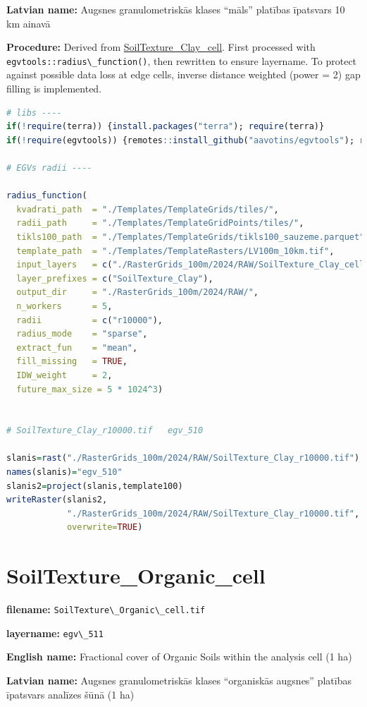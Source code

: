 \documentclass[
]{book}
\newcommand{\passthrough}[1]{#1}
\begin{document}
\textbf{Latvian name:} Augsnes granulometriskās klases ``māls'' platības īpatsvars 10 km ainavā

\textbf{Procedure:} Derived from \hyperref[ch06.506]{SoilTexture\_Clay\_cell}. First processed
with \passthrough{\lstinline!egvtools::radius\_function()!}, then rewritten to ensure layername. To protect against
possible data loss at edge cells, inverse distance weighted (power = 2) gap filling
is implemented.

\begin{lstlisting}[language=R]
# libs ----
if(!require(terra)) {install.packages("terra"); require(terra)}
if(!require(egvtools)) {remotes::install_github("aavotins/egvtools"); require(egvtools)}

# EGVs radii ----

radius_function(
  kvadrati_path  = "./Templates/TemplateGrids/tiles/",
  radii_path     = "./Templates/TemplateGridPoints/tiles/",
  tikls100_path  = "./Templates/TemplateGrids/tikls100_sauzeme.parquet",
  template_path  = "./Templates/TemplateRasters/LV100m_10km.tif",
  input_layers   = c("./RasterGrids_100m/2024/RAW/SoilTexture_Clay_cell.tif"),
  layer_prefixes = c("SoilTexture_Clay"),
  output_dir     = "./RasterGrids_100m/2024/RAW/",
  n_workers      = 5,
  radii          = c("r10000"),
  radius_mode    = "sparse",
  extract_fun    = "mean",
  fill_missing   = TRUE,
  IDW_weight     = 2,
  future_max_size = 5 * 1024^3)


# SoilTexture_Clay_r10000.tif   egv_510

slanis=rast("./RasterGrids_100m/2024/RAW/SoilTexture_Clay_r10000.tif")
names(slanis)="egv_510"
slanis2=project(slanis,template100)
writeRaster(slanis2,
            "./RasterGrids_100m/2024/RAW/SoilTexture_Clay_r10000.tif",
            overwrite=TRUE)
\end{lstlisting}

\section{SoilTexture\_Organic\_cell}\label{ch06.511}

\textbf{filename:} \passthrough{\lstinline!SoilTexture\_Organic\_cell.tif!}

\textbf{layername:} \passthrough{\lstinline!egv\_511!}

\textbf{English name:} Fractional cover of Organic Soils within the analysis cell (1 ha)

\textbf{Latvian name:} Augsnes granulometriskās klases ``organiskās augsnes'' platības īpatsvars analīzes šūnā (1 ha)
\end{document}
